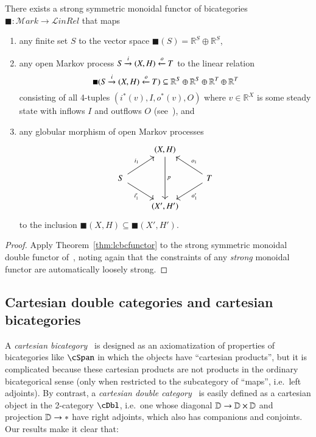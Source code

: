\begin{thm}
  There exists a strong symmetric monoidal functor of bicategories $\blacksquare : \mathcal{M}\mathit{ark} \to \mathcal{L}\mathit{inRel}$ that maps
  \begin{enumerate}
  \item any finite set $S$ to the vector space $\blacksquare(S) = \mathbb{R}^S \oplus \mathbb{R}^S$,
  \item any open Markov process $S \xrightarrow{i} (X,H) \xleftarrow{o} T$ to the linear relation
    \[ \blacksquare(S \xrightarrow{i} (X,H) \xleftarrow{o} T) \subseteq \mathbb{R}^S\oplus \mathbb{R}^S\oplus \mathbb{R}^T\oplus \mathbb{R}^T \]
    consisting of all 4-tuples $(i^*(v),I,o^*(v),O)$ where $v\in \mathbb{R}^X$ is some steady state with inflows $I$ and outflows $O$ (see~\cite[Definition 2.7]{bc:markov}), and
  \item any globular morphism of open Markov processes
    \[
      \begin{tikzcd}
        & {(X,H)} \arrow[dd, "p"] &  \\
        S \arrow[ru, "i_1"] \arrow[rd, "i_1'"'] &  & T \arrow[lu, "o_1"'] \arrow[ld, "o_1'"] \\
        & {(X',H')} & 
      \end{tikzcd}
    \]
    to the inclusion $\blacksquare(X,H) \subseteq \blacksquare(X',H')$.
  \end{enumerate}
\end{thm}
\begin{proof}
  Apply Theorem~\ref{thm:lcbcfunctor} to the strong symmetric monoidal double functor of~\cite[Theorem 5.5]{bc:markov}, noting again that the constraints of any \emph{strong} monoidal functor are automatically loosely strong.
\end{proof}

\subsection{Cartesian double categories and cartesian bicategories}
\label{sec:cartesian}

A \emph{cartesian bicategory}~\cite{cw:cart-bicats-i,ckww:cartbicats-ii} is designed as an axiomatization of properties of bicategories like $\cSpan$ in which the objects have ``cartesian products'', but it is complicated because these cartesian products are not products in the ordinary bicategorical sense (only when restricted to the subcategory of ``maps'', i.e.\ left adjoints).
By contrast, a \emph{cartesian double category}~\cite{aleiferi2018cartesian} is easily defined as a cartesian object in the 2-category $\cDbl$, i.e.\ one whose diagonal $\mathbb{D} \to \mathbb{D}\times \mathbb{D}$ and projection $\mathbb{D}\to *$ have right adjoints, which also has companions and conjoints.
Our results make it clear that:

